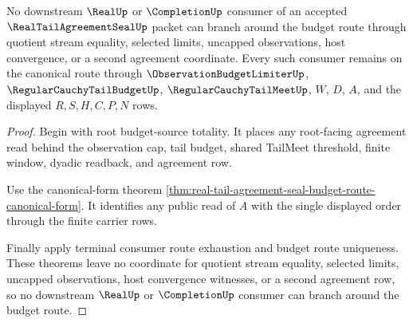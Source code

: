 \begin{theorem}
\label{thm:real-tail-agreement-seal-downstream-route-no-branching}
No downstream $\RealUp$ or $\CompletionUp$ consumer of an accepted $\RealTailAgreementSealUp$ packet can branch around the budget route through quotient stream equality, selected limits, uncapped observations, host convergence, or a second agreement coordinate. Every such consumer remains on the canonical route through $\ObservationBudgetLimiterUp$, $\RegularCauchyTailBudgetUp$, $\RegularCauchyTailMeetUp$, $W$, $D$, $A$, and the displayed $R,S,H,C,P,N$ rows.
\end{theorem}
\begin{proof}
Begin with root budget-source totality. It places any root-facing agreement read behind the observation cap, tail budget, shared TailMeet threshold, finite window, dyadic readback, and agreement row.

Use the canonical-form theorem \autoref{thm:real-tail-agreement-seal-budget-route-canonical-form}. It identifies any public read of $A$ with the single displayed order through the finite carrier rows.

Finally apply terminal consumer route exhaustion and budget route uniqueness. These theorems leave no coordinate for quotient stream equality, selected limits, uncapped observations, host convergence witnesses, or a second agreement row, so no downstream $\RealUp$ or $\CompletionUp$ consumer can branch around the budget route.
\end{proof}

